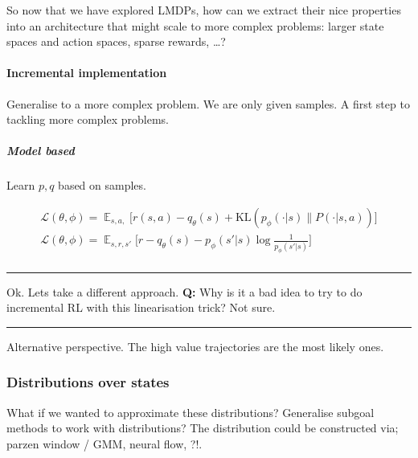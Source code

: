 So now that we have explored LMDPs, how can we extract their nice
properties into an architecture that might scale to more complex
problems: larger state spaces and action spaces, sparse rewards,
\ldots{}?

\hypertarget{incremental-implementation}{%
\paragraph{Incremental
implementation}\label{incremental-implementation}}

Generalise to a more complex problem. We are only given samples. A first
step to tackling more complex problems.

\hypertarget{model-based}{%
\subparagraph{Model based}\label{model-based}}

Learn \(p, q\) based on samples.

\begin{align}
\mathcal L(\theta, \phi) = \mathop{\mathbb E}_{s, a,} \bigg[ r(s, a) - q_\theta(s) + \text{KL}(p_\phi(\cdot | s) \parallel P(\cdot | s, a)) \bigg]\\
\mathcal L(\theta, \phi) = \mathop{\mathbb E}_{s, r, s'} \bigg[r - q_\theta(s) - p_\phi(s' | s) \log \frac{1}{ p_\phi(s' | s)} \bigg] \\
\end{align}

\begin{center}\rule{0.5\linewidth}{\linethickness}\end{center}

Ok. Lets take a different approach. \textbf{Q:} Why is it a bad idea to
try to do incremental RL with this linearisation trick? Not sure.

\begin{center}\rule{0.5\linewidth}{\linethickness}\end{center}

Alternative perspective. The high value trajectories are the most likely
ones.

\hypertarget{distributions-over-states}{%
\subsubsection{Distributions over states}\label{distributions-over-states}}

What if we wanted to approximate these distributions? Generalise subgoal
methods to work with distributions? The distribution could be
constructed via; parzen window / GMM, neural flow, ?!.

